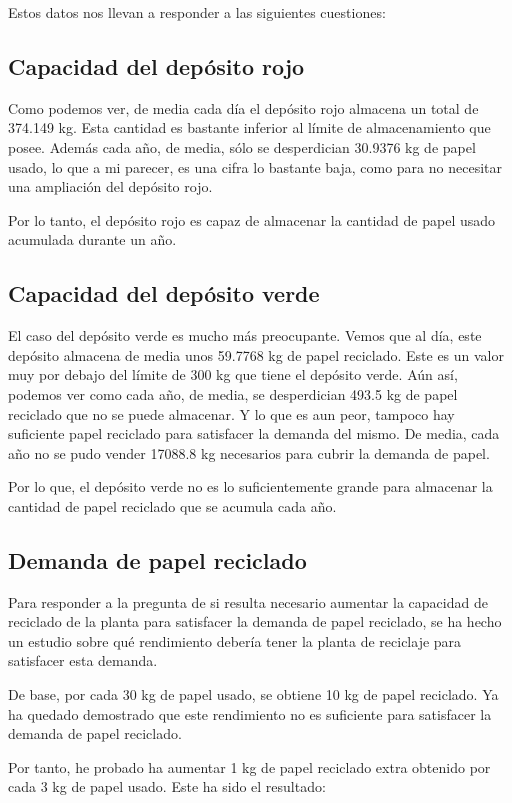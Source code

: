 Estos datos nos llevan a responder a las siguientes cuestiones:

\subsection{Capacidad del depósito rojo}
Como podemos ver, de media cada día el depósito rojo almacena un total de 374.149 kg. Esta cantidad es bastante inferior al límite de almacenamiento que posee. Además cada año, de media, sólo se desperdician 30.9376 kg de papel usado, lo que a mi parecer, es una cifra lo bastante baja, como para no necesitar una ampliación del depósito rojo.

Por lo tanto, el depósito rojo es capaz de almacenar la cantidad de papel usado acumulada durante un año.

\subsection{Capacidad del depósito verde}
El caso del depósito verde es mucho más preocupante. Vemos que al día, este depósito almacena de media unos 59.7768 kg de papel reciclado. Este es un valor muy por debajo del límite de 300 kg que tiene el depósito verde. Aún así, podemos ver como cada año, de media, se desperdician 493.5 kg de papel reciclado que no se puede almacenar.
Y lo que es aun peor, tampoco hay suficiente papel reciclado para satisfacer la demanda del mismo. De media, cada año no se pudo vender 17088.8 kg necesarios para cubrir la demanda de papel.

Por lo que, el depósito verde no es lo suficientemente grande para almacenar la cantidad de papel reciclado que se acumula cada año.

\subsection{Demanda de papel reciclado}

Para responder a la pregunta de si resulta necesario aumentar la capacidad de reciclado de la planta para satisfacer la demanda de papel reciclado, se ha hecho un estudio sobre qué rendimiento debería tener la planta de reciclaje para satisfacer esta demanda.

De base, por cada 30 kg de papel usado, se obtiene 10 kg de papel reciclado. Ya ha quedado demostrado que este rendimiento no es suficiente para satisfacer la demanda de papel reciclado.

Por tanto, he probado ha aumentar 1 kg de papel reciclado extra obtenido por cada 3 kg de papel usado. Este ha sido el resultado:

